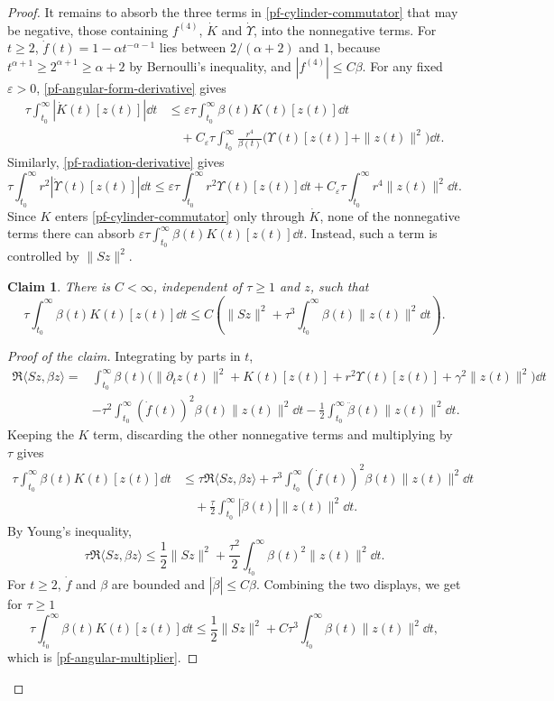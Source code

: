 \documentclass[final,reqno]{amsart}
\newtheorem*{claim}{Claim}
\theoremstyle{remark}
\newcommand{\dua}[2]{\langle #1, #2 \rangle}
\renewcommand{\epsilon}{\varepsilon}
\begin{document}
\begin{proof}
It remains to absorb the three terms in \cref{pf-cylinder-commutator}
that may be negative, those containing $f^{(4)}$, $\dot K$ and $\dot\Upsilon$,
into the nonnegative terms.
For $t\geq2$, $\dot f(t)=1-\alpha t^{-\alpha-1}$ lies between
$2/(\alpha+2)$ and $1$, because $t^{\alpha+1}\geq2^{\alpha+1}\geq\alpha+2$
by Bernoulli's inequality, and $|f^{(4)}|\leq C\beta$.
For any fixed $\epsilon>0$, \cref{pf-angular-form-derivative} gives
\begin{align*}
 \tau\int_{t_0}^\infty|\dot K(t)[z(t)]|\dd t
 &\leq\epsilon\tau\int_{t_0}^\infty\beta(t)K(t)[z(t)]\dd t\\
 &\quad+C_\epsilon\tau\int_{t_0}^\infty\frac{r^4}{\beta(t)}
                         \big(\Upsilon(t)[z(t)]+\|z(t)\|^2\big)\dd t.
\end{align*}
Similarly, \cref{pf-radiation-derivative} gives
\[
 \tau\int_{t_0}^\infty r^2|\dot\Upsilon(t)[z(t)]|\dd t
 \leq\epsilon\tau\int_{t_0}^\infty r^2\Upsilon(t)[z(t)]\dd t
        +C_\epsilon\tau\int_{t_0}^\infty r^4\|z(t)\|^2\dd t.
\]
Since $K$ enters \cref{pf-cylinder-commutator} only through $\dot K$, none
of the nonnegative terms there can absorb
$\epsilon\tau\int_{t_0}^\infty\beta(t)K(t)[z(t)]\dd t$.  Instead, such a
term is controlled by $\|Sz\|^2$.

\begin{claim}
There is $C<\infty$, independent of $\tau\geq1$ and $z$, such that
\begin{equation}\label{pf-angular-multiplier}
 \tau\int_{t_0}^\infty\beta(t)K(t)[z(t)]\dd t
 \leq C\left(\|Sz\|^2+
             \tau^3\int_{t_0}^\infty\beta(t)\|z(t)\|^2\dd t\right).
\end{equation}
\end{claim}

\begin{proof}[Proof of the claim]
Integrating by parts in $t$,
\begin{align*}
 \Re\dua{Sz}{\beta z}
 ={}&\int_{t_0}^\infty\beta(t)\big(\|\partial_tz(t)\|^2+K(t)[z(t)]
                   +r^2\Upsilon(t)[z(t)]+\gamma^2\|z(t)\|^2\big)\dd t\\
    &-\tau^2\int_{t_0}^\infty(\dot f(t))^2\beta(t)\|z(t)\|^2\dd t
       -\frac12\int_{t_0}^\infty\ddot\beta(t)\|z(t)\|^2\dd t.
\end{align*}
Keeping the $K$ term, discarding the other nonnegative terms and
multiplying by $\tau$ gives
\begin{align*}
 \tau\int_{t_0}^\infty\beta(t)K(t)[z(t)]\dd t
 &\leq\tau\Re\dua{Sz}{\beta z}
   +\tau^3\int_{t_0}^\infty(\dot f(t))^2\beta(t)\|z(t)\|^2\dd t\\
 &\quad+\frac\tau2\int_{t_0}^\infty|\ddot\beta(t)|\|z(t)\|^2\dd t.
\end{align*}
By Young's inequality,
\[
 \tau\Re\dua{Sz}{\beta z}
 \leq\frac12\|Sz\|^2
   +\frac{\tau^2}2\int_{t_0}^\infty\beta(t)^2\|z(t)\|^2\dd t.
\]
For $t\geq2$, $\dot f$ and $\beta$ are bounded and $|\ddot\beta|\leq C\beta$.
Combining the two displays, we get for $\tau\geq1$
\[
 \tau\int_{t_0}^\infty\beta(t)K(t)[z(t)]\dd t
 \leq\frac12\|Sz\|^2+C\tau^3\int_{t_0}^\infty\beta(t)\|z(t)\|^2\dd t,
\]
which is \cref{pf-angular-multiplier}.
\end{proof}


\end{proof}
\end{document}
